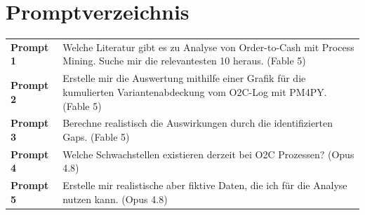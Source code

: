 \cleardoublepage
\chapter*{Promptverzeichnis}

\small
\renewcommand{\arraystretch}{1.35}

\begin{longtable}{@{}p{}p{}@{}}

\textbf{Prompt 1} &
Welche Literatur gibt es zu Analyse von Order-to-Cash mit Process Mining. Suche mir die relevantesten 10 heraus. (Fable 5)
\\[1.2em]

\textbf{Prompt 2} &
Erstelle mir die Auswertung mithilfe einer Grafik für die kumulierten Variantenabdeckung vom O2C-Log mit PM4PY. (Fable 5)
\\[1.2em]

\textbf{Prompt 3} &
Berechne realistisch die Auswirkungen durch die identifizierten Gaps. (Fable 5)
\\[1.2em]

\textbf{Prompt 4} &
Welche Schwachstellen existieren derzeit bei O2C Prozessen? (Opus 4.8)
\\[1.2em]

\textbf{Prompt 5} &
Erstelle mir realistische aber fiktive Daten, die ich für die  Analyse nutzen kann. (Opus 4.8)
\\[1.2em]

\end{longtable}

\normalsize